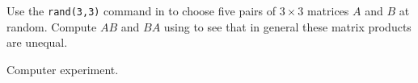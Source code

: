 \documentclass{ximera}
\begin{document}
\begin{exercise} \label{c4.7.2}
Use the {\tt rand(3,3)} command in \Matlab to choose five pairs of
$3\times 3$ matrices $A$ and $B$ at random.  Compute $AB$ and $BA$
using \Matlab to see that in general these matrix products are unequal.

\begin{solution}
Computer experiment.

\end{solution}
\end{exercise}
\end{document}
